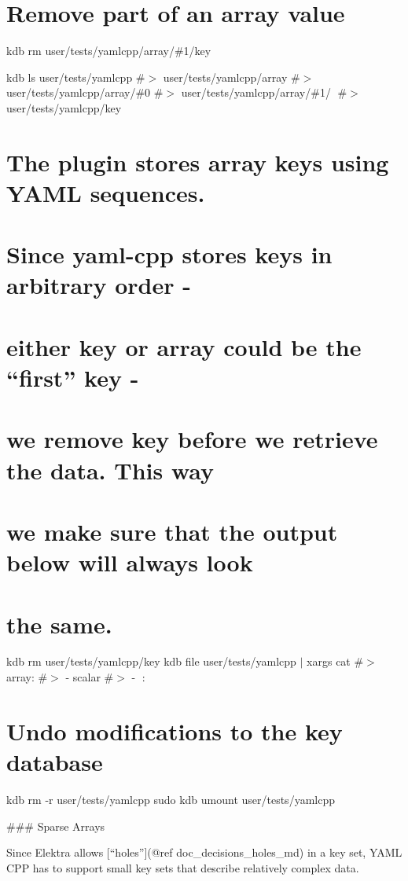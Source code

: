 \section*{Remove part of an array value}

kdb rm user/tests/yamlcpp/array/\#1/key

kdb ls user/tests/yamlcpp \#$>$ user/tests/yamlcpp/array \#$>$ user/tests/yamlcpp/array/\#0 \#$>$ user/tests/yamlcpp/array/\#1/🔑 \#$>$ user/tests/yamlcpp/key

\section*{The plugin stores array keys using Y\+A\+ML sequences.}

\section*{Since yaml-\/cpp stores keys in arbitrary order -\/}

\section*{either {\ttfamily key} or {\ttfamily array} could be the “first” key -\/}

\section*{we remove {\ttfamily key} before we retrieve the data. This way}

\section*{we make sure that the output below will always look}

\section*{the same.}

kdb rm user/tests/yamlcpp/key kdb file user/tests/yamlcpp $\vert$ xargs cat \#$>$ array\+: \#$>$ -\/ scalar \#$>$ -\/ 🔑\+: 🙈

\section*{Undo modifications to the key database}

kdb rm -\/r user/tests/yamlcpp sudo kdb umount user/tests/yamlcpp 
\begin{DoxyCode}
### Sparse Arrays

Since Elektra allows [“holes”](@ref doc\_decisions\_holes\_md) in a key set, YAML CPP has to support small key
       sets that describe relatively complex data.
\end{DoxyCode}
